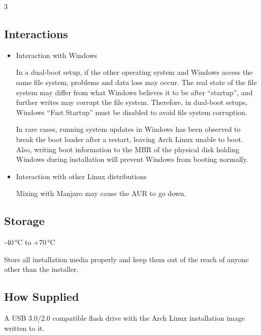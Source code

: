 \documentclass{article}
\begin{document}
\begin{multicols*}{3}
\begin{tcolorbox}
	\section*{Interactions}
	\end{tcolorbox}
	\begin{itemize}[leftmargin=*]
		\setlength{\parindent}{0pt}

		\item Interaction with Windows

		In a dual-boot setup, if the other operating system and Windows access the same file system, problems and data loss may occur. The real state of the file system may differ from what Windows believes it to be after ``startup'', and further writes may corrupt the file system. Therefore, in dual-boot setups, Windows ``Fast Startup'' must be disabled to avoid file system corruption.

		In rare cases, running system updates in Windows has been observed to break the boot loader after a restart, leaving Arch Linux unable to boot. Also, writing boot information to the MBR of the physical disk holding Windows during installation will prevent Windows from booting normally.

		\item Interaction with other Linux distributions

		Mixing with Manjaro may cause the AUR to go down.

	\end{itemize}


	\begin{tcolorbox}
	\section*{Storage}
	\end{tcolorbox}

	-40\,°C to +70\,°C

	Store all installation media properly and keep them out of the reach of anyone other than the installer.

	\medskip


	\begin{tcolorbox}
	\section*{How Supplied}
	\end{tcolorbox}

	A USB 3.0/2.0 compatible flash drive with the Arch Linux installation image written to it.


\end{multicols*}
\end{document}
